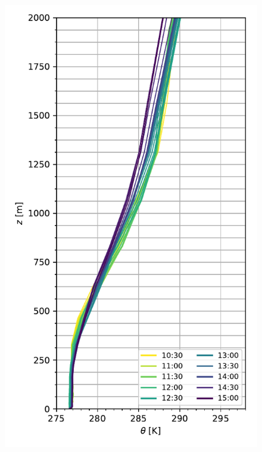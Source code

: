 \begin{figure}[H]
	\begin{minipage}{0.5\linewidth}
		\centering
		\includegraphics[width=0.9\linewidth,trim={0cm 5mm 0cm 0mm},clip]{Imagenes/06/bol_da/mean_pbl}%
	\end{minipage}%
	\begin{minipage}{0.5\linewidth}
		\centering

\end{minipage}
\end{figure}
